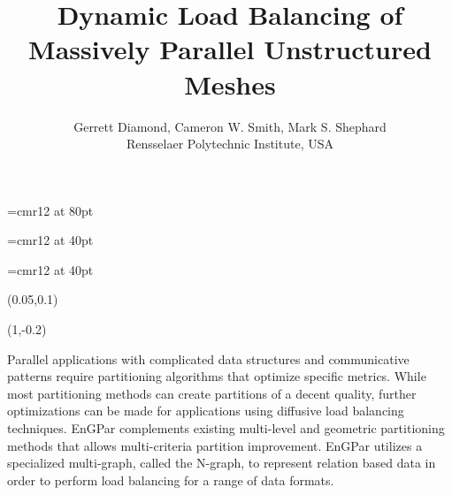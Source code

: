 \documentclass{beamer}
\begin{document}
\font\titlefont=cmr12 at 80pt
\title[Load Balancing of Unstructured Meshes]
{\titlefont
  Dynamic Load Balancing of \\[0.3cm]Massively Parallel Unstructured Meshes
}
\font\authorfont=cmr12 at 40pt
\author[G. Diamond]{\authorfont
  Gerrett Diamond, Cameron W. Smith, Mark S. Shephard\\
  Rensselaer Polytechnic Institute, USA}
\date{}
\font\abstractfont=cmr12 at 40pt
\begin{textblock}{15.8}(0.05,0.1)
  \titlepage
  \begin{textblock}{14}(1,-0.2)
    \begin{block}{}
      \begin{center}
      \abstractfont
      Parallel applications with complicated data structures and communicative patterns require partitioning algorithms that optimize specific metrics. While most partitioning methods can create partitions of a decent quality, further optimizations can be made for applications using diffusive load balancing techniques. EnGPar complements existing multi-level and geometric partitioning methods that allows multi-criteria partition improvement. EnGPar utilizes a specialized multi-graph, called the N-graph, to represent relation based data in order to perform load balancing for a range of data formats.
              
      \end{center}
    \end{block}
  \end{textblock}
\end{textblock}
\end{document}
